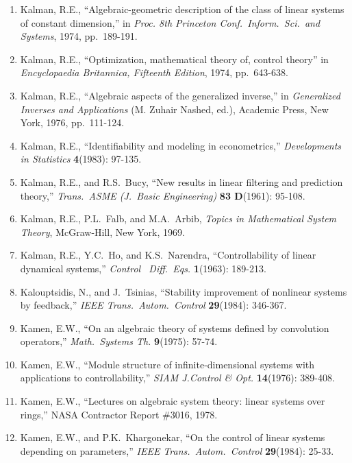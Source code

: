 \begin{enumerate}
\item
Kalman, R.E., ``Algebraic-geometric description of the class of linear systems
of constant dimension,'' in {\it Proc. 8th Princeton Conf.\ Inform.\ Sci.\ and
Systems}, 1974, pp.\ 189-191.

\item
Kalman, R.E., ``Optimization, mathematical theory of, control theory'' in {\it
Encyclopaedia Britannica, Fifteenth Edition}, 1974, pp.\ 643-638.

\item
Kalman, R.E., ``Algebraic aspects of the generalized inverse,'' in {\it
Generalized Inverses and Applications} (M. Zuhair Nashed, ed.), Academic
Press, New York, 1976, pp.\ 111-124.

\item
Kalman, R.E., ``Identifiability and modeling in econometrics,'' {\it
Developments in Statistics} {\bf 4}(1983): 97-135.

\item
Kalman, R.E., and R.S.\ Bucy, ``New results in linear filtering and prediction
theory,'' {\it Trans.\ ASME (J.\ Basic Engineering)} {\bf 83 D}(1961): 95-108.

\item
Kalman, R.E., P.L.\ Falb, and M.A.\ Arbib, {\it Topics in Mathematical System
Theory}, McGraw-Hill, New York, 1969.

\item
Kalman, R.E., Y.C.\ Ho, and K.S.\ Narendra, ``Controllability of linear
dynamical systems,'' {\it Control ~Diff.~Eqs.} {\bf 1}(1963): 189-213.

\item
Kalouptsidis, N., and J.\ Tsinias, ``Stability improvement of nonlinear
systems by feedback,'' {\it IEEE Trans.\ Autom.\ Control} {\bf 29}(1984):
346-367.

\item
Kamen, E.W., ``On an algebraic theory of systems defined by convolution
operators,'' {\it Math.\ Systems Th.} {\bf 9}(1975): 57-74.

\item
Kamen, E.W., ``Module structure of infinite-dimensional systems with
applications to controllability,'' {\it SIAM J.Control \& Opt.} {\bf
14}(1976): 389-408.

\item
Kamen, E.W., ``Lectures on algebraic system theory: linear systems over
rings,'' NASA Contractor Report \#3016, 1978.

\item
Kamen, E.W., and P.K.\ Khargonekar, ``On the control of linear systems
depending on parameters,'' {\it IEEE Trans.\ Autom.\ Control} {\bf 29}(1984):
25-33.


\end{enumerate}
